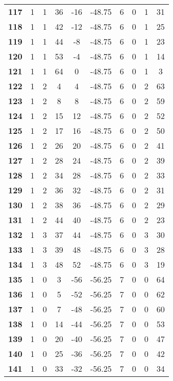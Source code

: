 \documentclass[12pt,letterpaper, onecolumn]{exam}
\begin{document}
\begin{longtable}{cccccccccc}
    \textbf{117} & 1 & 1 & 36 & -16 & -48.75 & 6 & 0 & 1 & 31 \\ 
    \textbf{118} & 1 & 1 & 42 & -12 & -48.75 & 6 & 0 & 1 & 25 \\ 
    \textbf{119} & 1 & 1 & 44 & -8 & -48.75 & 6 & 0 & 1 & 23 \\ 
    \textbf{120} & 1 & 1 & 53 & -4 & -48.75 & 6 & 0 & 1 & 14 \\ 
    \textbf{121} & 1 & 1 & 64 & 0 & -48.75 & 6 & 0 & 1 & 3 \\ 
    \textbf{122} & 1 & 2 & 4 & 4 & -48.75 & 6 & 0 & 2 & 63 \\ 
    \textbf{123} & 1 & 2 & 8 & 8 & -48.75 & 6 & 0 & 2 & 59 \\ 
    \textbf{124} & 1 & 2 & 15 & 12 & -48.75 & 6 & 0 & 2 & 52 \\ 
    \textbf{125} & 1 & 2 & 17 & 16 & -48.75 & 6 & 0 & 2 & 50 \\ 
    \textbf{126} & 1 & 2 & 26 & 20 & -48.75 & 6 & 0 & 2 & 41 \\ 
    \textbf{127} & 1 & 2 & 28 & 24 & -48.75 & 6 & 0 & 2 & 39 \\ 
    \textbf{128} & 1 & 2 & 34 & 28 & -48.75 & 6 & 0 & 2 & 33 \\ 
    \textbf{129} & 1 & 2 & 36 & 32 & -48.75 & 6 & 0 & 2 & 31 \\ 
    \textbf{130} & 1 & 2 & 38 & 36 & -48.75 & 6 & 0 & 2 & 29 \\ 
    \textbf{131} & 1 & 2 & 44 & 40 & -48.75 & 6 & 0 & 2 & 23 \\ 
    \textbf{132} & 1 & 3 & 37 & 44 & -48.75 & 6 & 0 & 3 & 30 \\ 
    \textbf{133} & 1 & 3 & 39 & 48 & -48.75 & 6 & 0 & 3 & 28 \\ 
    \textbf{134} & 1 & 3 & 48 & 52 & -48.75 & 6 & 0 & 3 & 19 \\ 
    \textbf{135} & 1 & 0 & 3 & -56 & -56.25 & 7 & 0 & 0 & 64 \\ 
    \textbf{136} & 1 & 0 & 5 & -52 & -56.25 & 7 & 0 & 0 & 62 \\ 
    \textbf{137} & 1 & 0 & 7 & -48 & -56.25 & 7 & 0 & 0 & 60 \\ 
    \textbf{138} & 1 & 0 & 14 & -44 & -56.25 & 7 & 0 & 0 & 53 \\ 
    \textbf{139} & 1 & 0 & 20 & -40 & -56.25 & 7 & 0 & 0 & 47 \\ 
    \textbf{140} & 1 & 0 & 25 & -36 & -56.25 & 7 & 0 & 0 & 42 \\ 
    \textbf{141} & 1 & 0 & 33 & -32 & -56.25 & 7 & 0 & 0 & 34 \\ 

\end{longtable}
\end{document}
